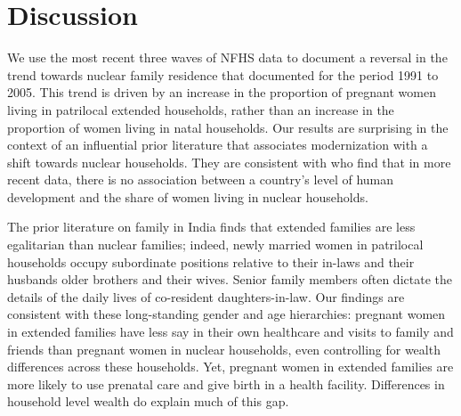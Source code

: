 \documentclass[10pt,twoside,reqno]{article}
\begin{document}
\section{Discussion}

We use the most recent three waves of NFHS data to document a reversal in the trend towards nuclear family residence that \cite{allendorf2013going} documented for the period 1991 to 2005.  This trend is driven by an increase in the proportion of pregnant women living in patrilocal extended households, rather than an increase in the proportion of women living in natal households. Our results are surprising in the context of an influential prior literature that associates modernization with a shift towards nuclear households.  They are consistent with \cite{pesando2018global} who find that in more recent data, there is no association between a country's level of human development and the share of women living in nuclear households.

The prior literature on family in India finds that extended families are less egalitarian than nuclear families; indeed, newly married women in patrilocal households occupy subordinate positions relative to their in-laws and their husbands older brothers and their wives. Senior family members often dictate the details of the daily lives of co-resident daughters-in-law. Our findings are consistent with these long-standing gender and age hierarchies: pregnant women in extended families have less say in their own healthcare and visits to family and friends than pregnant women in nuclear households, even controlling for wealth differences across these households. Yet, pregnant women in extended families are more likely to use prenatal care and give birth in a health facility.  Differences in household level wealth do explain much of this gap. 
\end{document}
